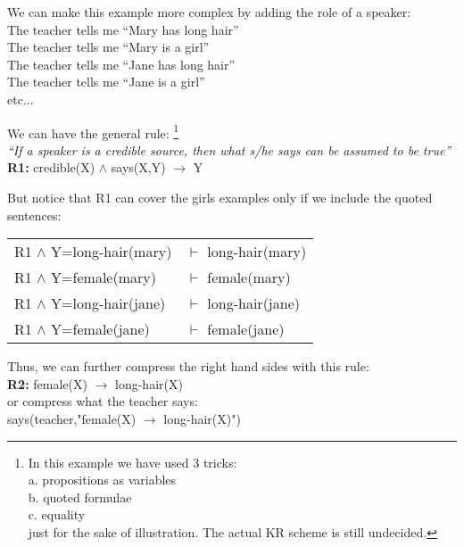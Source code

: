 We can make this example more complex by adding the role of a speaker:\\
\hspace*{1cm} The teacher tells me ``Mary has long hair''\\
\hspace*{1cm} The teacher tells me ``Mary is a girl''\\
\hspace*{1cm} The teacher tells me ``Jane has long hair''\\
\hspace*{1cm} The teacher tells me ``Jane is a girl''\\
\hspace*{1cm} etc...

We can have the general rule:
\footnote{In this example we have used 3 tricks:\\
a. propositions as variables\\
b. quoted formulae\\
c. equality\\
just for the sake of illustration.  The actual KR scheme is still undecided.}\\
\hspace*{1cm} \textit{``If a speaker is a credible source, then what s/he says can be assumed to be true''}\\
\hspace*{1cm} \textbf{R1:} \quad credible(X) $\wedge$ says(X,Y) $\rightarrow$ Y

But notice that R1 can cover the girls examples only if we include the quoted sentences:\\
\hspace*{1cm} \begin{tabular}{l l}
R1 $\wedge$ Y=long-hair(mary) & $\vdash$ long-hair(mary)\\
R1 $\wedge$ Y=female(mary)    & $\vdash$ female(mary)\\
R1 $\wedge$ Y=long-hair(jane) & $\vdash$ long-hair(jane)\\
R1 $\wedge$ Y=female(jane)    & $\vdash$ female(jane)
\end{tabular}

Thus, we can further compress the right hand sides with this rule:\\
\hspace*{1cm} \textbf{R2:} \quad female(X) $\rightarrow$ long-hair(X)\\
or compress what the teacher says:\\
\hspace*{1cm} says(teacher,"female(X) $\rightarrow$ long-hair(X)")

